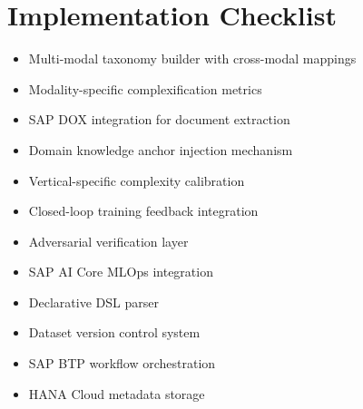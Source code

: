 \section{Implementation Checklist}

\begin{itemize}
  \item[\texttt{[ ]}] Multi-modal taxonomy builder with cross-modal mappings
  \item[\texttt{[ ]}] Modality-specific complexification metrics
  \item[\texttt{[ ]}] SAP DOX integration for document extraction
  \item[\texttt{[ ]}] Domain knowledge anchor injection mechanism
  \item[\texttt{[ ]}] Vertical-specific complexity calibration
  \item[\texttt{[ ]}] Closed-loop training feedback integration
  \item[\texttt{[ ]}] Adversarial verification layer
  \item[\texttt{[ ]}] SAP AI Core MLOps integration
  \item[\texttt{[ ]}] Declarative DSL parser
  \item[\texttt{[ ]}] Dataset version control system
  \item[\texttt{[ ]}] SAP BTP workflow orchestration
  \item[\texttt{[ ]}] HANA Cloud metadata storage
\end{itemize}